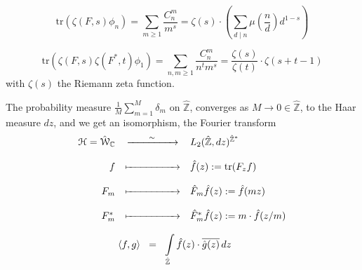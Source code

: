 \documentclass[leqno]{article}
\newcommand{\C}{\mathbb{C}}
\newcommand{\Z}{\mathbb{Z}}
\numberwithin{equation}{section}
\begin{document}
\begin{equation}
  \label{eq:12.39}
\text{tr}\left(\zeta (F,s)\phi_n\right) = \sum_{m\ge 1}\frac{C_n^m}{m^s}=\zeta(s)\cdot\left(\sum_{d\mid n}\mu\left(\frac{n}{d}\right) d^{1-s}\right)
\end{equation}

\begin{equation}
  \label{eq:12.40}
\text{tr}\left(\zeta(F,s)\zeta(F^{\ast},t)\phi_1\right) = \sum_{n,m\ge 1}\frac{C_n^m}{n^tm^s}= \frac{\zeta(s)}{\zeta(t)}\cdot \zeta (s+t-1)
\end{equation}
with $\zeta(s)$ the Riemann zeta function. 

  The probability measure $\frac{1}{M}\sum\limits_{m=1}^M\delta_m$ on $\hat{\Z}$, converges as $M\to 0 \in \hat{\Z}$, to the Haar measure
  $dz$, and we get an isomorphism, the Fourier transform
  \begin{equation}
    \label{eq:12.41}
    \begin{array}[h]{rcl}
      \mathcal{H}=\hat{\mathcal{W}}_{\C} &\xrightarrow{\qquad \sim  \qquad} & L_2(\hat{\Z},dz)^{\hat{\Z}^{\ast}} \\\\
      f &\xmapsto{\qquad\quad\qquad} &  \hat{f}(z):= \text{tr}(F_zf) \\\\
      F_{m } &\xmapsto{\qquad\quad\qquad} & \hat{F}_{m}\hat{f}(z):= \hat{f}(mz) \\\\
      F_m^{\ast} &\xmapsto{\qquad\quad\qquad} & \hat{F}_m^{\ast}\hat{f}(z) := m\cdot \hat{f}(z/m) \\\\
     \langle f,g \rangle \hspace{-9mm} &=& \hspace{-9mm} \displaystyle\int\limits_{\hat{\Z}}\hat{f}(z)\cdot \overline{\hat{g}(z)}\, dz

    \end{array}
  \end{equation}

\end{document}
